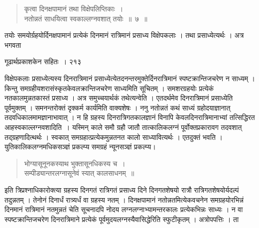 \documentclass[11pt, openany]{book}
\begin{document}

\begin{quote}
{\ssi कृत्वा दिनक्षपामानं तथा विक्षेपलिप्तिकाः~।\\
 नतोन्नतं साधयित्वा स्वकाल्लग्नवशात् तयोः~॥~७~॥ }
 \end{quote}

 तयोः समयोर्ग्रहयोर्दिनक्षपामानं प्रत्येकं दिनमानं रात्रिमानं प्रसाध्य विक्षेपकलाः । तथा प्रसाध्येत्यर्थः । अत्र भगवता
\textendash

\newpage

\hspace{3cm} गूढार्थप्रकाशकेन सहितः~। \hfill २१३
\vspace{1cm}


\noindent विक्षेपकलाः प्रसाध्येत्यस्य दिनरात्रिमानं प्रसाध्येत्येतदनन्तरमुक्तेर्दिनरात्रिमानं स्पष्टक्रान्तिजचरेण न साध्यम् । किन्तु समग्रहीयशरासंस्कृतकेवलक्रान्तिजचरेण साध्यमिति सूचितम् । समशरग्रहयोः प्रत्येकं नतकालमुन्नतकास्तं प्रसाध्य । अत्र समुच्चयार्थकं तथेत्यन्वेति । एतदर्थमेव दिनरात्रिमानं प्रसाध्येति पूर्वमुक्तम् । समनन्तरोक्तं दृक्कर्म कार्यमिति वाक्यशेषः । ननु नतोन्नतं कथं साध्यं ग्रहोदयाज्ञानात् तदवधिकालमामज्ञानाभावात् । न हि ग्रहस्य दिनरात्रिगतकालज्ञानं विनापि केवलदिनरात्रिमानाभ्यां तत्सिद्धिरत आह\textendash स्वकाल्लग्नवशादिति~। यस्मिन् काले समौ ग्रहौ जातौ तात्कालिकलग्नं पूर्वोक्तप्रकारावग तदवशात् तद्ग्रहणादित्थर्थः । स्वकात् समग्रहात्प्रत्येकमुन्नतनत कालो साध्यावित्यर्थः । एतदुक्तं भवति । युतिकालिकलग्नमधिकसञ्ज्ञं प्रकल्प्य समग्रहं न्यूनसञ्ज्ञं प्रकल्प्य। 


\begin{quote}
{\qt भोग्यासूनूनकस्याथ भुक्तासूनधिकस्य च~।\\
 सम्पीड्यान्तरलग्नासूनेवं स्यात् कालसाधनम्~॥ }
 \end{quote}


इति त्रिप्रश्नाधिकारोक्त्या ग्रहस्य दिनगतं रात्रिगतं प्रसाध्य दिने दिनगतशेषयो रात्रौ रात्रिगतशेषयोर्यदल्पं तदुन्नतम् । तेनोनं दिनार्धं रात्र्यर्धं वा ग्रहस्य नतम् । दिनक्षपामानं नतोन्नतमित्येकवचनेन समग्रहयोरभिन्नं दिनमानं रात्रिमानं नतमुन्नतं चेति सूचनादपि नोदय लग्नलग्नाभ्यामन्तरकालः प्रत्येकभिन्नः साध्यः । न वा स्पष्टक्रान्तिजचरेण दिनरात्रिमाने प्रत्येकं पूर्वमुदयलग्नस्यैवासिद्धेरिति स्फुटीकृतम् । अत्रोपपत्तिः । ता \textendash


\newpage
\end{document}
